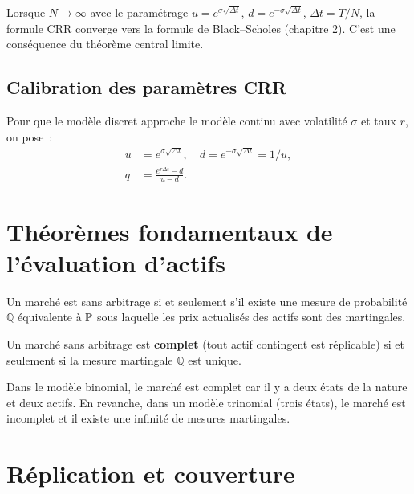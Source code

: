 \begin{intuition}[title=\textbf{Convergence vers Black--Scholes}]
Lorsque $N \to \infty$ avec le param\'etrage $u = e^{\sigma\sqrt{\Delta t}}$,
$d = e^{-\sigma\sqrt{\Delta t}}$, $\Delta t = T/N$, la formule CRR converge
vers la formule de Black--Scholes (chapitre 2). C'est une cons\'equence du
th\'eor\`eme central limite.
\end{intuition}

\subsection{Calibration des param\`etres CRR}

Pour que le mod\`ele discret approche le mod\`ele continu avec volatilit\'e
$\sigma$ et taux $r$, on pose~:
\begin{align}
    u &= e^{\sigma\sqrt{\Delta t}}, \quad d = e^{-\sigma\sqrt{\Delta t}} = 1/u, \\
    q &= \frac{e^{r\Delta t} - d}{u - d}.
\end{align}

\section{Th\'eor\`emes fondamentaux de l'\'evaluation d'actifs}

\begin{theoreme}
\label{thm:ftap1}
Un march\'e est sans arbitrage si et seulement s'il existe une mesure
de probabilit\'e $\mathbb{Q}$ \'equivalente \`a $\mathbb{P}$ sous laquelle les
prix actualis\'es des actifs sont des martingales.
\end{theoreme}

\begin{theoreme}
\label{thm:ftap2}
Un march\'e sans arbitrage est \textbf{complet} (tout actif contingent est
r\'eplicable) si et seulement si la mesure martingale $\mathbb{Q}$ est unique.
\end{theoreme}

\begin{remarque}
Dans le mod\`ele binomial, le march\'e est complet car il y a deux \'etats
de la nature et deux actifs. En revanche, dans un mod\`ele trinomial
(trois \'etats), le march\'e est incomplet et il existe une infinit\'e
de mesures martingales.
\end{remarque}

\section{R\'eplication et couverture}

